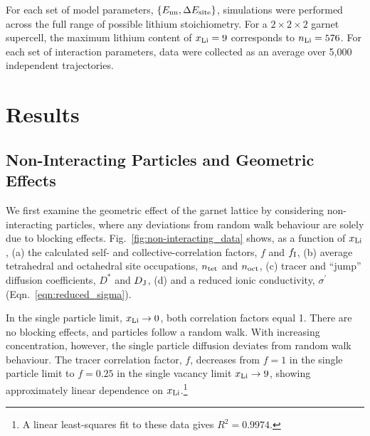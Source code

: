\documentclass[aps,prb,twocolumn,superscriptaddress,reprint]{revtex4-1}
\newcommand{\set}[1]{\left\{#1\right\}}
\newcommand{\xLi}{x_\m{Li}}
\begin{document}
For each set of model parameters, $\set{E_\m{nn}, \Delta E_\m{site}}$, simulations were performed across the full range of possible lithium stoichiometry. For a $2\times2\times2$ garnet supercell, the maximum lithium content of $\xLi=9$ corresponds to $n_{\mathrm{Li}}=576$. 
For each set of interaction parameters, data were collected as an average over 5,000 independent trajectories. 

\section{Results}
\subsection{Non-Interacting Particles and Geometric Effects}

We first examine the geometric effect of the garnet lattice by considering non-interacting particles, where any deviations from random walk behaviour are solely due to blocking effects.
Fig.~\ref{fig:non-interacting_data}  shows, as a function of $\xLi$, (a) the calculated self- and collective-correlation factors, $f$ and $f_{\mathrm{I}}$, (b) average tetrahedral and octahedral site occupations, $n_{\mathrm{tet}}$ and $n_{\mathrm{oct}}$, (c) tracer and ``jump'' diffusion coefficients, $D^*$ and $D_{\mathrm{J}}$, (d) and a reduced ionic conductivity, $\sigma^\prime$ (Eqn.~\ref{eqn:reduced_sigma}).

In the single particle limit, $\xLi\to0$, both correlation factors equal 1. There are no blocking effects, and particles follow a random walk. 
With increasing concentration, however, the single particle diffusion deviates from random walk behaviour. 
The tracer correlation factor, $f$, decreases from $f=1$ in the single particle limit to $f=0.25$ in the single vacancy limit $\xLi\to9$, showing approximately linear dependence on $\xLi$.\footnote{A linear least-squares fit to these data gives $R^2=0.9974$.}
\end{document}
